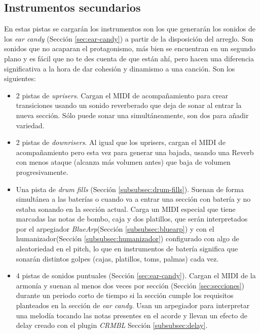 \subsection{Instrumentos secundarios}
\label{subsec:instrumentos-secundarios}
En estas pistas se cargarán los instrumentos son los que generarán los sonidos de los \textit{ear candy} (Sección \ref{sec:ear-candy}) a partir de la disposición del arreglo. Son sonidos que no acaparan el protagonismo, más bien se encuentran en un segundo plano y es fácil que no te des cuenta de que están ahí, pero hacen una diferencia significativa a la hora de dar cohesión y dinamismo a una canción. Son los siguientes:


\begin{itemize}
\item 2 pistas de \textit{uprisers}. Cargan el MIDI de acompañamiento para crear transiciones usando un sonido reverberado que deja de sonar al entrar la nueva sección. Sólo puede sonar una simultáneamente, son dos para añadir variedad.

\item 2 pistas de \textit{downrisers}. Al igual que los uprisers, cargan el MIDI de acompañamiento pero esta vez para generar una bajada, usando una Reverb con menos ataque (alcanza más volumen antes) que baja de volumen progresivamente.

\item Una pista de \textit{drum fills} (Sección \ref{subsubsec:drum-fills}). Suenan de forma simultánea a las baterías o cuando va a entrar una sección con batería y no estaba sonando en la sección actual. Carga un MIDI especial que tiene marcadas las notas de bombo, caja y dos platillos, que serán interpretados por el arpegiador \textit{BlueArp}(Sección \ref{subsubsec:bluearp}) y con el humanizador(Sección \ref{subsubsec:humanizador}) configurado con algo de aleatoriedad en el pitch, lo que en instrumentos de batería significa que sonarán distintos golpes (cajas, platillos, toms, palmas) cada vez.

\item 4 pistas de sonidos puntuales (Sección \ref{sec:ear-candy}). Cargan el MIDI de la armonía y suenan al menos dos veces por sección (Sección \ref{sec:secciones}) durante un periodo corto de tiempo si la sección cumple los requisitos planteados en la sección de \textit{ear candy}. Usan un arpegiador  para interpretar una melodía tocando las notas presentes en el acorde y llevan un efecto de delay creado con el plugin \textit{CRMBL} Sección \ref{subsubsec:delay}.
\end{itemize}


